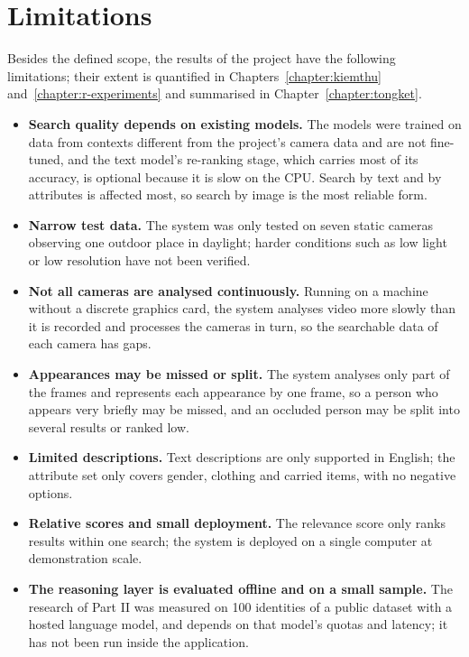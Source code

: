 \section{Limitations}
\label{sec:1.4}

Besides the defined scope, the results of the project have the following limitations; their extent is quantified in Chapters~\ref{chapter:kiemthu} and~\ref{chapter:r-experiments} and summarised in Chapter~\ref{chapter:tongket}.
\begin{itemize}
    \item \textbf{Search quality depends on existing models.} The models were trained on data from contexts different from the project's camera data and are not fine-tuned, and the text model's re-ranking stage, which carries most of its accuracy, is optional because it is slow on the CPU. Search by text and by attributes is affected most, so search by image is the most reliable form.
    \item \textbf{Narrow test data.} The system was only tested on seven static cameras observing one outdoor place in daylight; harder conditions such as low light or low resolution have not been verified.
    \item \textbf{Not all cameras are analysed continuously.} Running on a machine without a discrete graphics card, the system analyses video more slowly than it is recorded and processes the cameras in turn, so the searchable data of each camera has gaps.
    \item \textbf{Appearances may be missed or split.} The system analyses only part of the frames and represents each appearance by one frame, so a person who appears very briefly may be missed, and an occluded person may be split into several results or ranked low.
    \item \textbf{Limited descriptions.} Text descriptions are only supported in English; the attribute set only covers gender, clothing and carried items, with no negative options.
    \item \textbf{Relative scores and small deployment.} The relevance score only ranks results within one search; the system is deployed on a single computer at demonstration scale.
    \item \textbf{The reasoning layer is evaluated offline and on a small sample.} The research of Part II was measured on 100 identities of a public dataset with a hosted language model, and depends on that model's quotas and latency; it has not been run inside the application.
\end{itemize}
